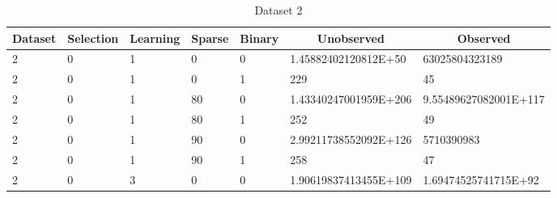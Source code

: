 \documentclass{article}
\theoremstyle{definition}
\begin{document}
\begin{table}[]
\centering
\caption{Dataset 2}
\label{my-label}
\begin{tabular}{|l|l|l|l|l|l|l|}
\hline
\multicolumn{1}{|c|}{\textbf{Dataset}} & \multicolumn{1}{c|}{\textbf{Selection}} & \multicolumn{1}{c|}{\textbf{Learning}} & \multicolumn{1}{c|}{\textbf{Sparse}} & \multicolumn{1}{c|}{\textbf{Binary}} & \multicolumn{1}{c|}{\textbf{Unobserved}} & \multicolumn{1}{c|}{\textbf{Observed}} \\ \hline
2                                      & 0                                       & 1                                      & 0                                    & 0                                      & 1.45882402120812E+50                     & 63025804323189                         \\ \hline
2                                      & 0                                       & 1                                      & 0                                    & 1                                      & 229                                      & 45                                     \\ \hline
2                                      & 0                                       & 1                                      & 80                                   & 0                                      & 1.43340247001959E+206                    & 9.55489627082001E+117                  \\ \hline
2                                      & 0                                       & 1                                      & 80                                   & 1                                      & 252                                      & 49                                     \\ \hline
2                                      & 0                                       & 1                                      & 90                                   & 0                                      & 2.99211738552092E+126                    & 5710390983                             \\ \hline
2                                      & 0                                       & 1                                      & 90                                   & 1                                      & 258                                      & 47                                     \\ \hline
2                                      & 0                                       & 3                                      & 0                                    & 0                                      & 1.90619837413455E+109                    & 1.69474525741715E+92                   \\ \hline

\end{tabular}
\end{table}
\end{document}
